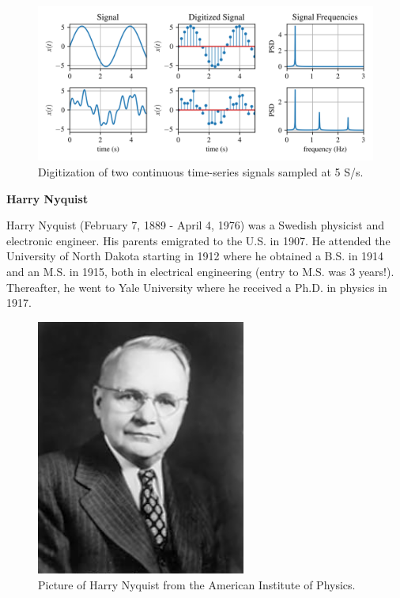 \documentclass[12pt,letter]{article}
\begin{document}
\begin{figure}[H]
    \centering
    \includegraphics[width=6.5in]{../figures/signal_digitization.png}
    \caption{Digitization of two continuous time-series signals sampled at 5 S/s.}
    \label{fig:signal_digitization}
\end{figure}


	\begin{review}
	\label{sec:Harry_Nyquist}
		
		\textbf{Harry Nyquist}

		\noindent Harry Nyquist (February 7, 1889 - April 4, 1976) was a Swedish physicist and electronic engineer. His parents emigrated to the U.S. in 1907.  He attended the University of North Dakota starting in 1912 where he obtained a B.S. in 1914 and an M.S. in 1915, both in electrical engineering (entry to M.S. was 3 years!). Thereafter, he went to Yale University where he received a Ph.D. in physics in 1917.

		\begin{figure}[H]
			\centering
			\includegraphics[width=2.71in]{../figures/Harry_Nyquist.jpg}
			\caption{Picture of Harry Nyquist from the American Institute of Physics.\protect\footnotemark[1]}
			\label{fig:Harry_Nyquist}
		\end{figure}
	\end{review}
	
\end{document}
